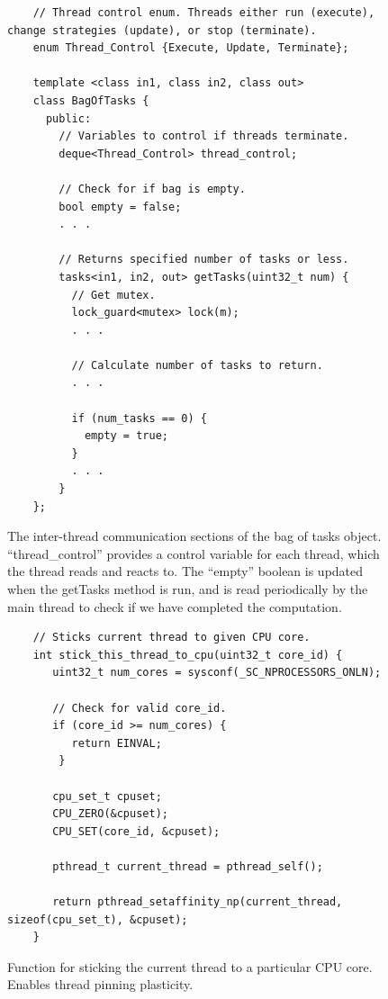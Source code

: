 \begin{figure}
	\begin{lstlisting}
	// Thread control enum. Threads either run (execute), change strategies (update), or stop (terminate).
	enum Thread_Control {Execute, Update, Terminate};

	template <class in1, class in2, class out>
	class BagOfTasks {
	  public:
	    // Variables to control if threads terminate.
	    deque<Thread_Control> thread_control;

	    // Check for if bag is empty.
	    bool empty = false;
	    . . .

	    // Returns specified number of tasks or less. 
	    tasks<in1, in2, out> getTasks(uint32_t num) {
	      // Get mutex. 
	      lock_guard<mutex> lock(m);
		  . . .

		  // Calculate number of tasks to return.
		  . . .

		  if (num_tasks == 0) {
		    empty = true;
	      }
		  . . .
		}
	};
	\end{lstlisting}

	\caption{The inter-thread communication sections of the bag of tasks object. ``thread\_control'' provides a control variable for each thread, which the thread reads and reacts to. The ``empty'' boolean is updated when the getTasks method is run, and is read periodically by the main thread to check if we have completed the computation.}
	\label{fig:implementation_bot_comms}
\end{figure}



\begin{figure}
	\begin{lstlisting}
	// Sticks current thread to given CPU core.
	int stick_this_thread_to_cpu(uint32_t core_id) {
	   uint32_t num_cores = sysconf(_SC_NPROCESSORS_ONLN);

	   // Check for valid core_id.
	   if (core_id >= num_cores) {
	      return EINVAL;
	    }

	   cpu_set_t cpuset;
	   CPU_ZERO(&cpuset);
	   CPU_SET(core_id, &cpuset);

	   pthread_t current_thread = pthread_self();    

	   return pthread_setaffinity_np(current_thread, sizeof(cpu_set_t), &cpuset);
	}
	\end{lstlisting}

	\caption{Function for sticking the current thread to a particular CPU core. Enables thread pinning plasticity.}
	\label{fig:implementation_thread_pinning}
\end{figure}



